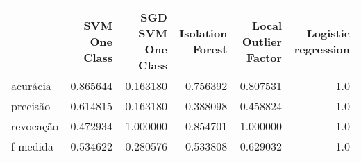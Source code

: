 \begin{tabular}{lrrrrr}
\toprule
{} &  SVM One Class &  SGD SVM One Class &  Isolation Forest &  Local Outlier Factor &  Logistic regression \\
\midrule
acurácia  &       0.865644 &           0.163180 &          0.756392 &              0.807531 &                  1.0 \\
precisão  &       0.614815 &           0.163180 &          0.388098 &              0.458824 &                  1.0 \\
revocação &       0.472934 &           1.000000 &          0.854701 &              1.000000 &                  1.0 \\
f-medida  &       0.534622 &           0.280576 &          0.533808 &              0.629032 &                  1.0 \\
\bottomrule
\end{tabular}
